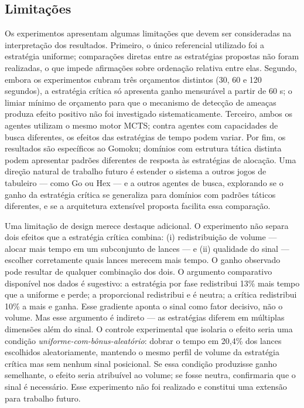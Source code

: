\documentclass[cic,tc]{iiufrgs}
\begin{document}
\subsection{Limitações}
\label{sec:discussion_limitations}

Os experimentos apresentam algumas limitações que devem ser consideradas na interpretação dos resultados. Primeiro, o único referencial utilizado foi a estratégia uniforme; comparações diretas entre as estratégias propostas não foram realizadas, o que impede afirmações sobre ordenação relativa entre elas. Segundo, embora os experimentos cubram três orçamentos distintos (30, 60 e 120 segundos), a estratégia crítica só apresenta ganho mensurável a partir de 60 s; o limiar mínimo de orçamento para que o mecanismo de detecção de ameaças produza efeito positivo não foi investigado sistematicamente. Terceiro, ambos os agentes utilizam o mesmo motor MCTS; contra agentes com capacidades de busca diferentes, os efeitos das estratégias de tempo podem variar. Por fim, os resultados são específicos ao Gomoku; domínios com estrutura tática distinta podem apresentar padrões diferentes de resposta às estratégias de alocação. Uma direção natural de trabalho futuro é estender o sistema a outros jogos de tabuleiro — como Go ou Hex — e a outros agentes de busca, explorando se o ganho da estratégia crítica se generaliza para domínios com padrões táticos diferentes, e se a arquitetura extensível proposta facilita essa comparação.

Uma limitação de design merece destaque adicional. O experimento não separa dois efeitos que a estratégia crítica combina: (i) redistribuição de volume — alocar mais tempo em um subconjunto de lances — e (ii) qualidade do sinal — escolher corretamente quais lances merecem mais tempo. O ganho observado pode resultar de qualquer combinação dos dois. O argumento comparativo disponível nos dados é sugestivo: a estratégia por fase redistribui 13\% mais tempo que a uniforme e perde; a proporcional redistribui e é neutra; a crítica redistribui 10\% a mais e ganha. Esse gradiente aponta o sinal como fator decisivo, não o volume. Mas esse argumento é indireto — as estratégias diferem em múltiplas dimensões além do sinal. O controle experimental que isolaria o efeito seria uma condição \emph{uniforme-com-bônus-aleatório}: dobrar o tempo em 20,4\% dos lances escolhidos aleatoriamente, mantendo o mesmo perfil de volume da estratégia crítica mas sem nenhum sinal posicional. Se essa condição produzisse ganho semelhante, o efeito seria atribuível ao volume; se fosse neutra, confirmaria que o sinal é necessário. Esse experimento não foi realizado e constitui uma extensão para trabalho futuro.
\end{document}
